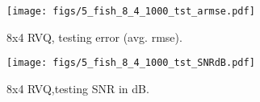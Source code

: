 								\begin{figure}[h!]
								\centering
								\texttt{[image: figs/5\_fish\_8\_4\_1000\_tst\_armse.pdf]}
								\caption{8x4 RVQ, testing error (avg. rmse).}
								\label{fig:5_fish_8_4_1000_tst_armse}
								\end{figure}

								\begin{figure}[h!]
								\centering
								\texttt{[image: figs/5\_fish\_8\_4\_1000\_tst\_SNRdB.pdf]}
								\caption{8x4 RVQ,testing SNR in dB.}
								\label{fig:5_fish_8_4_1000_tst_SNRdB}
								\end{figure}

